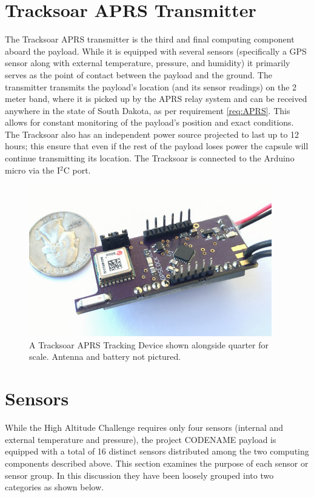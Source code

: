 \documentclass[english]{report}
\begin{document}
\section{Tracksoar APRS Transmitter}

The Tracksoar APRS transmitter is the third and final computing component
aboard the payload. While it is equipped with several sensors (specifically
a GPS sensor along with external temperature, pressure, and humidity)
it primarily serves as the point of contact between the payload and
the ground. The transmitter transmits the payload's location (and
its sensor readings) on the 2 meter band, where it is picked up by
the APRS relay system and can be received anywhere in the state of
South Dakota, as per requirement \ref{req:APRS}. This allows for constant monitoring of the payload's
position and exact conditions. The Tracksoar also has an independent
power source projected to last up to 12 hours; this ensure that even
if the rest of the payload loses power the capsule will continue transmitting
its location.  The Tracksoar is connected to the Arduino micro via the I$^2$C port.

\begin{figure}[H]
\begin{centering}
\includegraphics{./images/tracksoar}
\par\end{centering}
\caption{A Tracksoar APRS Tracking Device shown alongside quarter for scale. Antenna and battery not pictured.}
\end{figure}


\pagebreak
\section{Sensors}

While the High Altitude Challenge requires only four sensors (internal
and external temperature and pressure), the project CODENAME payload
is equipped with a total of 16 distinct sensors distributed among
the two computing components described above. This section examines
the purpose of each sensor or sensor group.  In this discussion they have been loosely grouped into two categories
as shown below\@.
\end{document}
